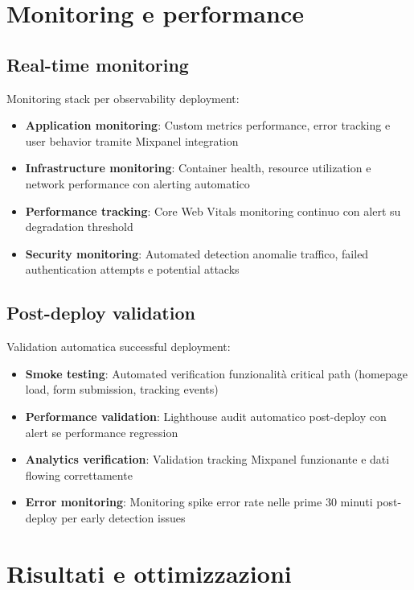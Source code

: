 \section{Monitoring e performance}

\subsection{Real-time monitoring}
Monitoring stack per observability deployment:
\begin{itemize}
  \item \textbf{Application monitoring}: Custom metrics performance, error 
  tracking e user behavior tramite Mixpanel integration
  \item \textbf{Infrastructure monitoring}: Container health, resource utilization 
  e network performance con alerting automatico
  \item \textbf{Performance tracking}: Core Web Vitals monitoring continuo con 
  alert su degradation threshold
  \item \textbf{Security monitoring}: Automated detection anomalie traffico, 
  failed authentication attempts e potential attacks
\end{itemize}

\subsection{Post-deploy validation}
Validation automatica successful deployment:
\begin{itemize}
  \item \textbf{Smoke testing}: Automated verification funzionalità critical 
  path (homepage load, form submission, tracking events)
  \item \textbf{Performance validation}: Lighthouse audit automatico post-deploy 
  con alert se performance regression
  \item \textbf{Analytics verification}: Validation tracking Mixpanel funzionante 
  e dati flowing correttamente
  \item \textbf{Error monitoring}: Monitoring spike error rate nelle prime 
  30 minuti post-deploy per early detection issues
\end{itemize}

\section{Risultati e ottimizzazioni}

